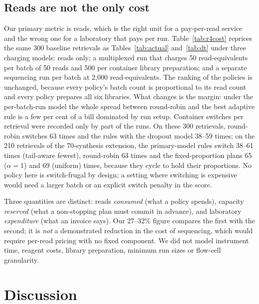 \documentclass[conference,onecolumn,11pt]{IEEEtran}
\begin{document}
\subsection{Reads are not the only cost}\label{sec:res-cost}

Our primary metric is reads, which is the right unit for a pay-per-read service and the wrong one for a
laboratory that pays per run.  Table~\ref{tab:r4cost} reprices the same 300 baseline retrievals as
Tables~\ref{tab:actual} and~\ref{tab:dt} under three charging models: reads only; a multiplexed run that
charges 50 read-equivalents per batch of 50 reads and 500 per container library preparation; and a
separate sequencing run per batch at 2{,}000 read-equivalents.  The ranking of the policies is unchanged,
because every policy's batch count is proportional to its read count and every policy prepares all six
libraries.  What changes is the margin: under the per-batch-run model the whole spread between
round-robin and the best adaptive rule is a few per cent of a bill dominated by run setup.  Container
switches per retrieval were recorded only by part of the runs.  On these 300 retrievals, round-robin
switches 63 times and the rules with the dropout model 38--59 times; on the 210 retrievals of
the 70-synthesis extension, the primary-model rules switch 38--61 times (tail-aware fewest), round-robin
63 times and the fixed-proportion plans 65 ($\alpha{=}1$) and 69 (uniform) times, because they cycle to
hold their proportions.  No policy here is switch-frugal by design; a setting where switching is
expensive would need a larger batch or an explicit switch penalty in the score.

Three quantities are distinct: reads \emph{consumed} (what a policy spends), capacity \emph{reserved}
(what a non-stopping plan must commit in advance), and laboratory \emph{expenditure} (what an invoice
says).  Our 27--32\% figure compares the first with the second; it is \emph{not} a demonstrated
reduction in the cost of sequencing, which would require per-read pricing with no fixed component.  We
did not model instrument time, reagent costs, library preparation, minimum run sizes or flow-cell
granularity.

\section{Discussion}\label{sec:disc}
\end{document}
